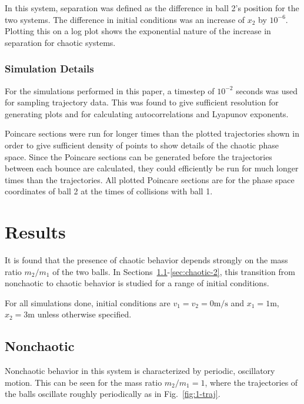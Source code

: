 \documentclass[pra,twocolumn,showpacs,amsmath,amssymb, aps, 10pt]{revtex4-1}
\begin{document}
In this system, separation was defined as the difference in ball 2's position
for the two systems. The difference in initial conditions was an increase of
$x_2$ by $10^{-6}$. Plotting this on a log plot shows the exponential nature
of the increase in separation for chaotic systems.


\subsubsection{Simulation Details}

For the simulations performed in this paper, a timestep
of $10^{-2}$ seconds was used for sampling trajectory data. This was found to give
sufficient resolution for generating plots and for calculating autocorrelations and
Lyapunov exponents.


Poincare sections were run for longer times than the plotted trajectories shown
in order to give sufficient density of points to show details of the
chaotic phase space. Since the Poincare sections can be generated
before the trajectories between each bounce are calculated, they could
efficiently be run for much longer times than the trajectories. All plotted
Poincare sections are for the phase space coordinates of ball 2 at the times of
collisions with ball 1.





\section{Results} \label{sec:results}

It is found that the presence of chaotic behavior depends strongly on the
mass ratio $m_2/m_1$ of the two balls. In Sections~\ref{sec:nonchaotic}-\ref{sec:chaotic-2},
this transition from nonchaotic to chaotic behavior is studied for a range of
initial conditions.

For all simulations done, initial conditions are $v_1 = v_2 = 0 \mathrm{m/s}$ and
$x_1 = 1$m, $x_2 = 3$m unless otherwise specified.


\subsection{Nonchaotic}\label{sec:nonchaotic}
Nonchaotic behavior in this system is characterized by periodic, oscillatory motion.
This can be seen for the mass ratio $m_2/m_1 = 1$, where the trajectories of
the balls oscillate roughly periodically as in Fig.~\ref{fig:1-traj}.
\end{document}
